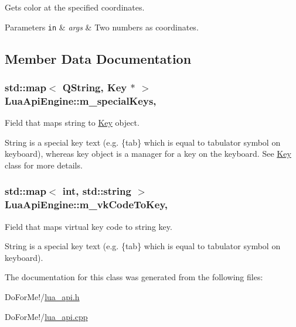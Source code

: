 Gets color at the specified coordinates. 


\begin{DoxyParams}[1]{Parameters}
\mbox{\tt in}  & {\em args} & Two numbers as coordinates. \\
\hline
\end{DoxyParams}


\subsection{Member Data Documentation}
\hypertarget{class_lua_api_engine_a9fdba2d7f2f8d051453b5d1561435f5e}{
\subsubsection[{m\-\_\-special\-Keys}]{\setlength{\rightskip}{0pt plus 5cm}std\-::map$<$ Q\-String, {\bf Key} $\ast$ $>$ Lua\-Api\-Engine\-::m\-\_\-special\-Keys\hspace{0.3cm}{\ttfamily [static]}, {\ttfamily [private]}}}\label{class_lua_api_engine_a9fdba2d7f2f8d051453b5d1561435f5e}


Field that maps string to \hyperlink{class_key}{Key} object. 

String is a special key text (e.\-g. \{tab\} which is equal to tabulator symbol on keyboard), whereas key object is a manager for a key on the keyboard. See \hyperlink{class_key}{Key} class for more details. \hypertarget{class_lua_api_engine_a7578ac36e34620f441fd9f828663c36c}{
\subsubsection[{m\-\_\-vk\-Code\-To\-Key}]{\setlength{\rightskip}{0pt plus 5cm}std\-::map$<$ int, std\-::string $>$ Lua\-Api\-Engine\-::m\-\_\-vk\-Code\-To\-Key\hspace{0.3cm}{\ttfamily [static]}, {\ttfamily [private]}}}\label{class_lua_api_engine_a7578ac36e34620f441fd9f828663c36c}


Field that maps virtual key code to string key. 

String is a special key text (e.\-g. \{tab\} which is equal to tabulator symbol on keyboard). 

The documentation for this class was generated from the following files\-:\begin{DoxyCompactItemize}
\item 
Do\-For\-Me!/\hyperlink{lua__api_8h}{lua\-\_\-api.\-h}\item 
Do\-For\-Me!/\hyperlink{lua__api_8cpp}{lua\-\_\-api.\-cpp}\end{DoxyCompactItemize}
